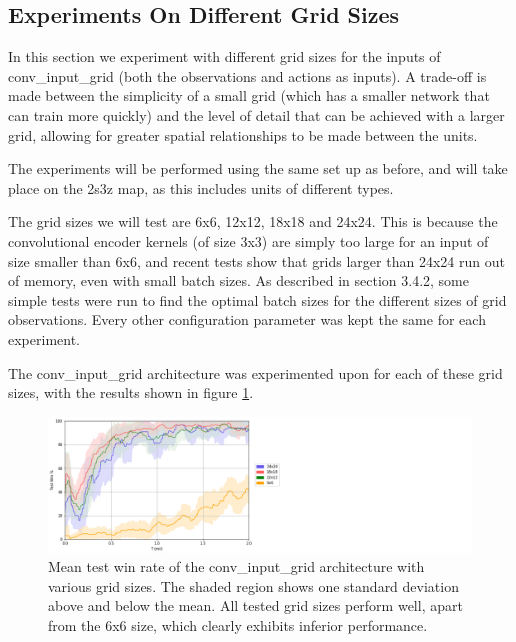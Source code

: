 \subsection{Experiments On Different Grid Sizes}
In this section we experiment with different grid sizes for the inputs of conv\_input\_grid (both the observations and actions as inputs). A trade-off is made between the simplicity of a small grid (which has a smaller network that can train more quickly) and the level of detail that can be achieved with a larger grid, allowing for greater spatial relationships to be made between the units.

The experiments will be performed using the same set up as before, and will take place on the 2s3z map, as this includes units of different types.



The grid sizes we will test  are 6x6, 12x12, 18x18 and 24x24. This is because the convolutional encoder kernels (of size 3x3) are simply too large for an input of size smaller than 6x6, and recent tests show that grids larger than 24x24 run out of memory, even with small batch sizes. As described in section 3.4.2, some simple tests were run to find the optimal batch sizes for the different sizes of grid observations. Every other configuration parameter was kept the same for each experiment.





The conv\_input\_grid architecture was experimented upon for each of these grid sizes, with the results shown in figure \ref{fig:gridsizes}.


\begin{figure}
    \centering
    \hbox{\hspace{5em}\includegraphics[scale=0.5]{images/graphs/grids.png}}
    \caption{Mean test win rate of the conv\_input\_grid architecture with various grid sizes. The shaded region shows one standard deviation above and below the mean. All tested grid sizes perform well, apart from the 6x6 size, which clearly exhibits inferior performance.}
    \label{fig:gridsizes}
\end{figure}

